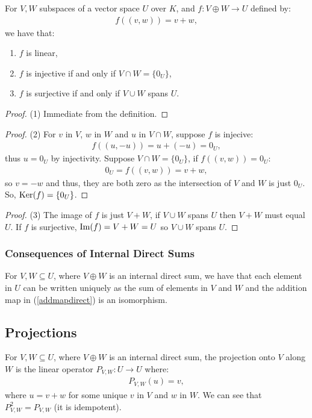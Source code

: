 For $V, W$ subspaces of a vector space $U$ over $K$, and $f : V \oplus W \to U$
defined by: \begin{gather*}
  f((v, w)) = v + w,
\end{gather*} we have that: \begin{enumerate}
  \item $f$ is linear,
  \item $f$ is injective if and only if $V \cap W = \{0_U\}$,
  \item $f$ is surjective if and only if $V \cup W$ spans $U$.
\end{enumerate}
\begin{proof}
    (1) Immediate from the definition.
\end{proof}
\begin{proof}
    (2) For $v$ in $V$, $w$ in $W$ and $u$ in $V \cap W$, suppose $f$ is 
    injecive: \begin{align*}
        f((u, -u)) = u + (-u) = 0_U,
    \end{align*} thus $u = 0_U$ by injectivity. Suppose $V \cap W = \{0_U\}$,
    if $f((v, w)) = 0_U$: \begin{gather*}
        0_U = f((v, w)) = v + w,
    \end{gather*} so $v = -w$ and thus, they are both zero as the
    intersection of $V$ and $W$ is just $0_U$. So, $\operatorname{Ker}(f) = \{0_U\}$.
\end{proof}
\begin{proof}
    (3) The image of $f$ is just $V + W$, if $V \cup W$ spans $U$ then
    $V + W$ must equal $U$. If $f$ is surjective, $\operatorname{Im}(f) = V + W = U$
    so $V \cup W$ spans $U$.
\end{proof}

\subsubsection{Consequences of Internal Direct Sums}

For $V, W \subseteq U$, where $V \oplus W$ is an internal direct sum,
we have that each element in $U$ can be written uniquely as the sum
of elements in $V$ and $W$ and the addition map in (\ref{addmapdirect})
is an isomorphism.

\subsection{Projections}

For $V, W \subseteq U$, where $V \oplus W$ is an internal direct sum,
the projection onto $V$ along $W$ is the linear operator 
$P_{V, W} : U \to U$ where: \begin{gather*}
  P_{V, W}(u) = v,
\end{gather*} where $u = v + w$ for some unique $v$ in $V$ and
$w$ in $W$. We can see that $P_{V, W}^2 = P_{V, W}$ (it is idempotent).


